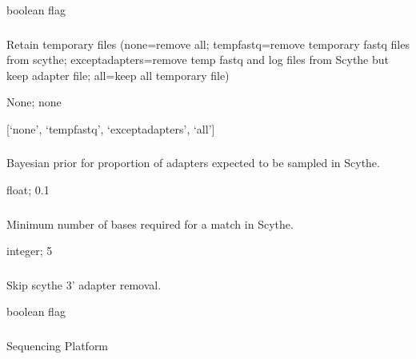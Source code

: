 \documentclass[letterpaper,11pt,english]{sphinxmanual}
\begin{document}
 boolean flag


\subsubsection{}
\label{\detokenize{prog_desc:retain-temp}}
 Retain temporary files (none=remove all; tempfastq=remove temporary fastq files from scythe; exceptadapters=remove temp fastq and log files from Scythe but keep adapter file; all=keep all temporary file)

 None;  none

 {[}‘none’, ‘tempfastq’, ‘exceptadapters’, ‘all’{]}


\subsubsection{}
\label{\detokenize{prog_desc:s-scythe-prior}}
 Bayesian prior for proportion of adapters expected to be sampled in Scythe.

 float;  0.1


\subsubsection{}
\label{\detokenize{prog_desc:scythe-match}}
 Minimum number of bases required for a match in Scythe.

 integer;  5


\subsubsection{}
\label{\detokenize{prog_desc:scythe-skip}}
 Skip scythe 3’ adapter removal.

 boolean flag


\subsubsection{}
\label{\detokenize{prog_desc:t-platform}}
 Sequencing Platform
\end{document}
